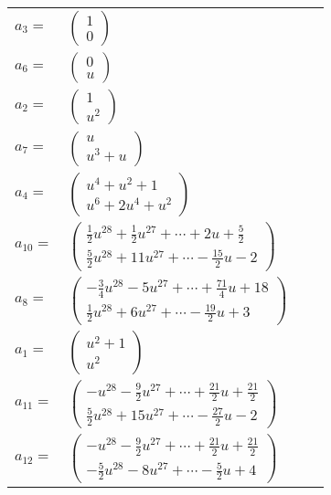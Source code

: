 \documentclass[1p]{elsarticle_modified}
\theoremstyle{definition}
\begin{document}
\begin{tabular}{m{7pt} m{180pt} m{7pt} m{180pt} }
\flushright $a_{3}=$&$\begin{pmatrix}1\\0\end{pmatrix}$ \\
\flushright $a_{6}=$&$\begin{pmatrix}0\\u\end{pmatrix}$ \\
\flushright $a_{2}=$&$\begin{pmatrix}1\\u^2\end{pmatrix}$ \\
\flushright $a_{7}=$&$\begin{pmatrix}u\\u^3+u\end{pmatrix}$ \\
\flushright $a_{4}=$&$\begin{pmatrix}u^4+u^2+1\\u^6+2 u^4+u^2\end{pmatrix}$ \\
\flushright $a_{10}=$&$\begin{pmatrix}\frac{1}{2} u^{28}+\frac{1}{2} u^{27}+\cdots+2 u+\frac{5}{2}\\\frac{5}{2} u^{28}+11 u^{27}+\cdots-\frac{15}{2} u-2\end{pmatrix}$ \\
\flushright $a_{8}=$&$\begin{pmatrix}-\frac{3}{4} u^{28}-5 u^{27}+\cdots+\frac{71}{4} u+18\\\frac{1}{2} u^{28}+6 u^{27}+\cdots-\frac{19}{2} u+3\end{pmatrix}$ \\
\flushright $a_{1}=$&$\begin{pmatrix}u^2+1\\u^2\end{pmatrix}$ \\
\flushright $a_{11}=$&$\begin{pmatrix}- u^{28}-\frac{9}{2} u^{27}+\cdots+\frac{21}{2} u+\frac{21}{2}\\\frac{5}{2} u^{28}+15 u^{27}+\cdots-\frac{27}{2} u-2\end{pmatrix}$ \\
\flushright $a_{12}=$&$\begin{pmatrix}- u^{28}-\frac{9}{2} u^{27}+\cdots+\frac{21}{2} u+\frac{21}{2}\\-\frac{5}{2} u^{28}-8 u^{27}+\cdots-\frac{5}{2} u+4\end{pmatrix}$ \\

\end{tabular}
\end{document}
